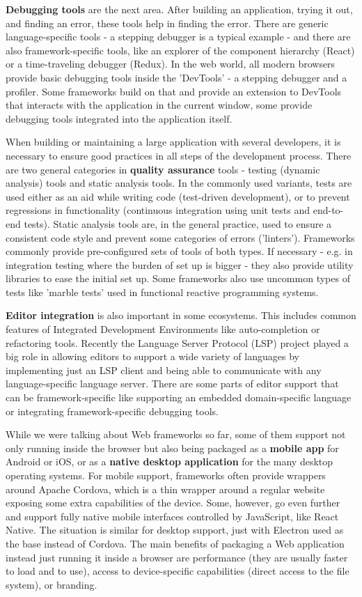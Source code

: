 \documentclass[english,odsaz]{fitthesis}
\begin{document}
\textbf{Debugging tools} are the next area. After building an application, trying it out,
and finding an error, these tools help in finding the error. There are generic
language-specific tools - a stepping debugger is a typical example - and there
are also framework-specific tools, like an explorer of the component hierarchy
(React) or a time-traveling debugger (Redux). In the web world, all modern
browsers provide basic debugging tools inside the 'DevTools' - a stepping
debugger and a profiler. Some frameworks build on that and provide an extension
to DevTools that interacts with the application in the current window, some
provide debugging tools integrated into the application itself.

When building or maintaining a large application with several developers, it is
necessary to ensure good practices in all steps of the development
process. There are two general categories in \textbf{quality assurance} tools - testing
(dynamic analysis) tools and static analysis tools. In the commonly used
variants, tests are used either as an aid while writing code (test-driven
development), or to prevent regressions in functionality (continuous integration
using unit tests and end-to-end tests). Static analysis tools are, in the
general practice, used to ensure a consistent code style and prevent some
categories of errors ('linters'). Frameworks commonly provide pre-configured
sets of tools of both types. If necessary - e.g. in integration testing where
the burden of set up is bigger - they also provide utility libraries to ease the
initial set up. Some frameworks also use uncommon types of tests like 'marble
tests' used in functional reactive programming systems.

\textbf{Editor integration} is also important in some ecosystems. This includes common
features of Integrated Development Environments like auto-completion or
refactoring tools. Recently the Language Server Protocol (LSP) \cite{lsp} project
played a big role in allowing editors to support a wide variety of languages by
implementing just an LSP client and being able to communicate with any
language-specific language server. There are some parts of editor support that
can be framework-specific like supporting an embedded domain-specific language
or integrating framework-specific debugging tools.

While we were talking about Web frameworks so far, some of them support not only
running inside the browser but also being packaged as a \textbf{mobile app} for Android
or iOS, or as a \textbf{native desktop application} for the many desktop operating
systems. For mobile support, frameworks often provide wrappers around Apache
Cordova, which is a thin wrapper around a regular website exposing some extra
capabilities of the device. Some, however, go even further and support fully
native mobile interfaces controlled by JavaScript, like React Native. The
situation is similar for desktop support, just with Electron used as the base
instead of Cordova. The main benefits of packaging a Web application instead
just running it inside a browser are performance (they are usually faster to
load and to use), access to device-specific capabilities (direct access to the
file system), or branding.
\end{document}
